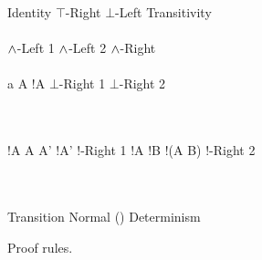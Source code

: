 \begin{FIGURE}
\begin{RULES}

  \ZEROPREMISERULENAMEDRIGHT
  {
    \phi \judge \phi
  }{Identity}
    \quad
  \ZEROPREMISERULENAMEDRIGHT
  {
    \phi \judge \top
  }{$\top$-Right}
    \quad
  \ZEROPREMISERULENAMEDRIGHT
  {
    \bot \judge \phi
  }{$\bot$-Left}
    \quad
  \TWOPREMISERULENAMEDRIGHT
  {
    \phi \judge \psi
  }
  {
    \psi \judge \xi
  }
  {
    \phi \judge \xi
  }{Transitivity}
    \\\\
  \ONEPREMISERULENAMEDRIGHT
  {
    \phi \judge \psi
  }
  {
    \phi \AND \xi \judge \psi
  }{$\land$-Left 1}
     \quad
  \ONEPREMISERULENAMEDRIGHT
  {
    \phi \judge \psi
  }
  {
    \xi \AND \phi  \judge \psi
  }{$\land$-Left 2}
     \quad
  \TWOPREMISERULENAMEDRIGHT
  {
    \phi \judge \psi
  }
  {
    \phi \judge \xi
  }
  {
    \phi \judge \psi \AND \xi
  }{$\land$-Right}
     \\\\
     \ONEPREMISERULENAMEDRIGHT
     {
       a \notin A
     }
     {
       !A \AND {} \judge \bot
     }{$\bot$-Right 1}
        \quad
     \ZEROPREMISERULENAMEDRIGHT
     {
        \judge \bot
     }{$\bot$-Right 2}

     \\\\
     \TWOPREMISERULENAMEDRIGHT
     {
       \phi \judge !A
     }
     {
       A \subseteq A'
     }
     {
       \phi \judge!A'
     }{!-Right 1}
     \quad
     \TWOPREMISERULENAMEDRIGHT
     {
       \phi \judge !A
     }
     {
       \phi \judge !B
     }
     {
       \phi \judge !(A \cap B)
     }{!-Right 2}

     \\\\
     \ONEPREMISERULENAMEDRIGHT
     {
       \phi \judge \psi
     }
     {
        \judge {}
     }{Transition Normal}
     \quad
     \ONEPREMISERULENAMEDRIGHT
     {
       \phi \judge {}\psi \land {}\xi
     }
     {
       \phi \judge {}(\psi \land \xi)
     }{Determinism}
\end{RULES}
\caption{Proof rules.}\label{figure:elAndBangRules}
\end{FIGURE}
